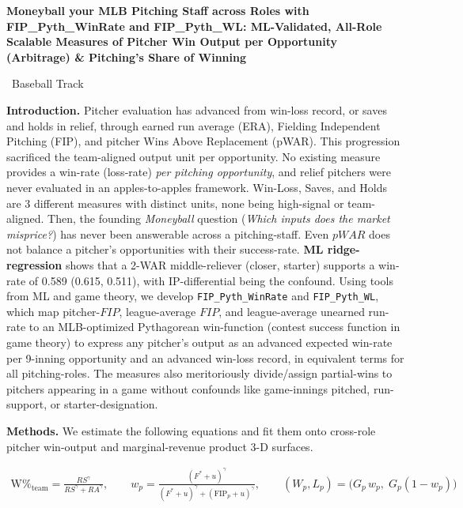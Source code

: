\documentclass[11pt]{article}
\begin{document}
\begin{center}
{\large\bfseries\setlength{\baselineskip}{1.05\baselineskip}
Moneyball your MLB Pitching Staff across Roles with FIP\_Pyth\_WinRate and
FIP\_Pyth\_WL: ML-Validated, All-Role Scalable Measures of Pitcher Win Output per
Opportunity (Arbitrage) \& Pitching's Share of Winning\par}\vspace{3pt}\par
{\small  \textbullet\ Baseball Track}
\end{center}

\textbf{Introduction.} Pitcher evaluation has advanced from win-loss record, or saves and holds in relief, through earned run average (ERA), Fielding Independent
Pitching (FIP), and pitcher Wins Above Replacement (pWAR). This progression sacrificed the team-aligned output unit per opportunity. No existing measure provides a win-rate (loss-rate) \emph{per pitching opportunity}, and relief pitchers were never evaluated in an apples-to-apples framework. Win-Loss, Saves, and Holds are 3 different measures with distinct units, none being high-signal or team-aligned. Then, the founding \emph{Moneyball} question (\emph{Which inputs does the market misprice?}) has never been answerable across a pitching-staff. Even $pWAR$ does not balance a pitcher's opportunities with their success-rate. \textbf{ML ridge-regression} shows that a 2-WAR middle-reliever (closer, starter) supports a win-rate of 0.589 (0.615, 0.511), with IP-differential being the confound. Using tools from ML and game theory, we develop \texttt{FIP\_Pyth\_WinRate} and \texttt{FIP\_Pyth\_WL}, which map pitcher-$FIP$, league-average $FIP$, and league-average unearned run-rate to an MLB-optimized Pythagorean win-function (contest success function in game theory) to express any pitcher's output as an advanced expected win-rate per 9-inning opportunity and an advanced win-loss record, in equivalent terms for all pitching-roles. The measures also meritoriously divide/assign partial-wins to pitchers appearing in a game without confounds like game-innings pitched, run-support, or starter-designation. 

\vspace{6pt}
\noindent\textbf{Methods.} We estimate the following equations and fit them onto cross-role pitcher win-output and marginal-revenue product 3-D surfaces.
\vspace{-8pt}

{\setlength{\abovedisplayskip}{0pt}\setlength{\belowdisplayskip}{3pt}
\begin{small} \begin{align}
\text{W\%}_{\text{team}}=\frac{RS^{\gamma}}{RS^{\gamma}+RA^{\gamma}},\qquad
w_{p}=\frac{(F^{*}+u)^{\gamma}}{(F^{*}+u)^{\gamma}+(\mathrm{FIP}_{p}+u)^{\gamma}},\qquad
(W_{p},L_{p})=\bigl(G_{p}\,w_{p},\; G_{p}(1-w_{p})\bigr)
\end{align}
\end{small}}
\end{document}
